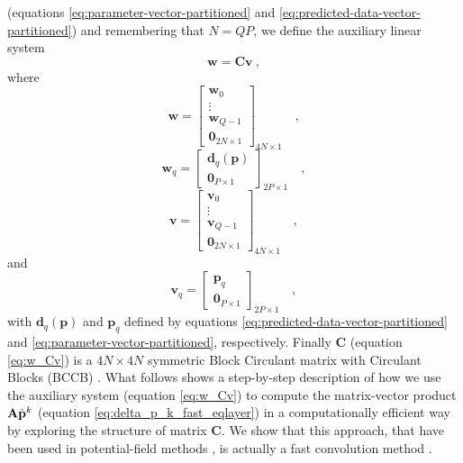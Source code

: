 (equations \ref{eq:parameter-vector-partitioned} and \ref{eq:predicted-data-vector-partitioned}) 
and remembering that $N = QP$, we define the auxiliary linear system
\begin{equation}
\mathbf{w} = \mathbf{C} \mathbf{v} \: ,
\label{eq:w_Cv}
\end{equation}
where
\begin{equation}
\mathbf{w} = \begin{bmatrix}
\mathbf{w}_{0} \\
\vdots \\
\mathbf{w}_{Q - 1} \\
\mathbf{0}_{2N \times 1}
\end{bmatrix}_{4N \times 1} \quad ,
\label{eq:w-vector}
\end{equation}
\begin{equation}
\mathbf{w}_{q} = \begin{bmatrix}
\mathbf{d}_{q}(\mathbf{p}) \\
\mathbf{0}_{P \times 1}
\end{bmatrix}_{2P \times 1}
\label{eq:wq-vector} \quad ,
\end{equation}
\begin{equation}
\mathbf{v} = \begin{bmatrix}
\mathbf{v}_{0} \\
\vdots \\
\mathbf{v}_{Q - 1} \\
\mathbf{0}_{2N \times 1}
\end{bmatrix}_{4N \times 1} \quad ,
\label{eq:v-vector}
\end{equation}
and
\begin{equation}
\mathbf{v}_{q} = \begin{bmatrix}
\mathbf{p}_{q} \\
\mathbf{0}_{P \times 1}
\end{bmatrix}_{2P \times 1}
\label{eq:vq-vector} \quad ,
\end{equation}
with $\mathbf{d}_{q}(\mathbf{p})$ and $\mathbf{p}_{q}$ defined by
equations \ref{eq:predicted-data-vector-partitioned} and 
\ref{eq:parameter-vector-partitioned}, respectively.
Finally $\mathbf{C}$ (equation \ref{eq:w_Cv}) is a 
$4N \times 4N$ symmetric Block Circulant matrix with Circulant Blocks (BCCB) 
\citep[][ p. 184]{davis1979}.
What follows shows a step-by-step description of how we use the auxiliary 
system (equation \ref{eq:w_Cv}) to compute the matrix-vector product 
$\tensor{A} \hat{\mathbf{p}}^{k}$ (equation \ref{eq:delta_p_k_fast_eqlayer}) in 
a computationally efficient way by exploring the structure of matrix $\mathbf{C}$.
We show that this approach, that have been used in potential-field methods
\citep[e.g.,][]{zhang-wong2015, zhang-etal2016, qiang_etal2019}, is actually a fast 
convolution method \citep[e.g.,][ p. 213]{vanloan1992}.

